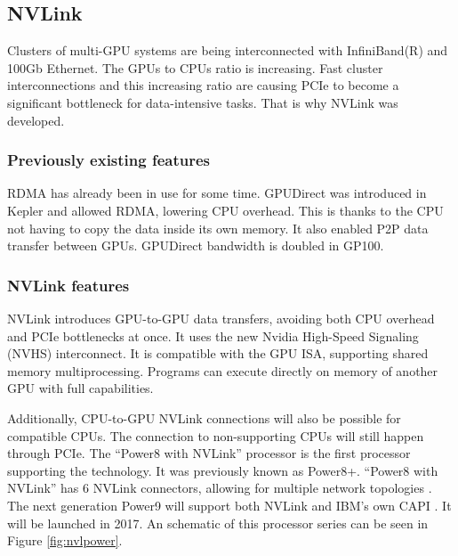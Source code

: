 \subsection{NVLink}

Clusters of multi-GPU systems are being interconnected with InfiniBand(R) and 100Gb Ethernet.
The GPUs to CPUs ratio is increasing.
Fast cluster interconnections and this increasing ratio are causing PCIe to become a significant bottleneck for data-intensive tasks.
That is why NVLink was developed.

\subsubsection{Previously existing features}
RDMA has already been in use for some time.
GPUDirect was introduced in Kepler and allowed RDMA, lowering CPU overhead.
This is thanks to the CPU not having to copy the data inside its own memory.
It also enabled P2P data transfer between GPUs.
GPUDirect bandwidth is doubled in GP100.
\subsubsection{NVLink features}
NVLink introduces GPU-to-GPU data transfers, avoiding both CPU overhead and PCIe bottlenecks at once.
It uses the new Nvidia High-Speed Signaling (NVHS) interconnect.
It is compatible with the GPU ISA, supporting shared memory multiprocessing.
Programs can execute directly on memory of another GPU with full capabilities.

Additionally, CPU-to-GPU NVLink connections will also be possible for compatible CPUs.
The connection to non-supporting CPUs will still happen through PCIe.
The ``Power8 with NVLink'' processor is the first processor supporting the technology.
It was previously known as Power8+.
``Power8 with NVLink'' has 6 NVLink connectors, allowing for multiple network topologies \cite{openpower:roadmap}.
The next generation Power9 will support both NVLink and IBM's own CAPI \cite{openpower:interconnect2016}.
It will be launched in 2017.
An schematic of this processor series can be seen in Figure \ref{fig:nvlpower}.

